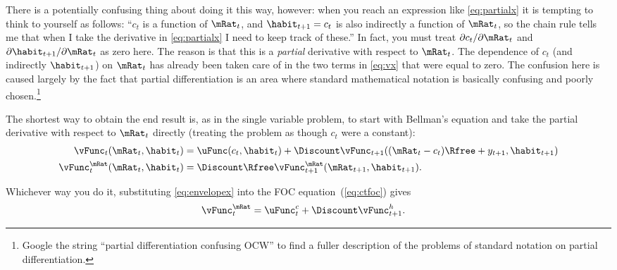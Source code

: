 There is a potentially confusing thing about doing it this way,
however: when you reach an expression like \eqref{eq:partialx} it is
tempting to think to yourself as follows: ``$c_{t}$ is a function of
$\mRat_{t}$, and $\habit_{t+1}=c_{t}$ is also indirectly a function of $\mRat_{t}$,
so the chain rule tells me that when I take the derivative in
\eqref{eq:partialx} I need to keep track of these.''  In fact, you
must treat $\partial c_{t}/\partial \mRat_{t}$ and $\partial
\habit_{t+1}/\partial \mRat_{t}$ as zero here.  The reason is that this is a
{\it partial} derivative with respect to $\mRat_{t}$.  The dependence of
$c_{t}$ (and indirectly $\habit_{t+1}$) on $\mRat_{t}$ has already been taken
care of in the two terms in \eqref{eq:vx} that were equal to zero.
The confusion here is caused largely by the fact that partial
differentiation is an area where standard mathematical notation is
basically confusing and poorly chosen.\footnote{Google the string ``partial differentiation confusing OCW'' to find a fuller description of the problems of standard notation on partial differentiation.}

The shortest way to obtain the end result is, as in the single
variable problem, to start with Bellman's equation and take the
partial derivative with respect to $\mRat_{t}$ directly (treating the
problem as though $c_{t}$ were a constant):
\begin{equation}\begin{gathered}\begin{aligned}
        \vFunc_{t}(\mRat_{t},\habit_{t}) & =  \uFunc(c_{t},\habit_{t})+\Discount \vFunc_{t+1}((\mRat_{t}-c_{t})\Rfree+y_{t+1},\habit_{t+1})  \\
        \vFunc_{t}^{\mRat}(\mRat_{t},\habit_{t}) & =  \Discount \Rfree \vFunc_{t+1}^{\mRat}(\mRat_{t+1},\habit_{t+1}).
\end{aligned}\end{gathered}\end{equation}

Whichever way you do it, substituting \eqref{eq:envelopex} into the
FOC equation~(\ref{eq:ctfoc}) gives
\begin{equation}\begin{gathered}\begin{aligned}
\vFunc_{t}^{\mRat} & =  \uFunc^{c}_{t}+\Discount \vFunc_{t+1}^{h}. \label{eq:ctfocsubx}
\end{aligned}\end{gathered}\end{equation}


